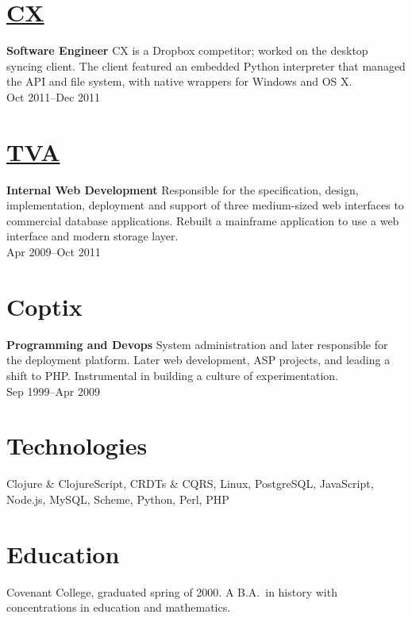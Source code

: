 \documentclass[margin]{res}
\begin{document}
\begin{resume}
\section{\href{https://www.cx.com/}{CX}}
{\bf Software Engineer}
%
CX is a Dropbox competitor; worked on the desktop syncing client. The
client featured an embedded Python interpreter that managed the API
and file system, with native wrappers for Windows and OS X.\\
%
Oct 2011--Dec 2011

\section{\href{http://tva.gov/}{TVA}}
{\bf Internal Web Development}
%
Responsible for the specification, design, implementation, deployment
and support of three medium-sized web interfaces to commercial
database applications. Rebuilt a mainframe application to use a web
interface and modern storage layer.\\
%
Apr 2009--Oct 2011

\section{Coptix}
{\bf Programming and Devops}
%
System administration and later responsible for the deployment
platform. Later web development, ASP projects, and leading a shift to
PHP. Instrumental in building a culture of experimentation.\\
%
Sep 1999--Apr 2009

\section{Technologies}

Clojure \& ClojureScript, CRDTs \& CQRS, Linux, PostgreSQL, JavaScript,
Node.js, MySQL, Scheme, Python, Perl, PHP

\section{Education}

Covenant College, graduated spring of 2000. A B.A.\ in history with
concentrations in education and mathematics.

\end{resume}
\end{document}
